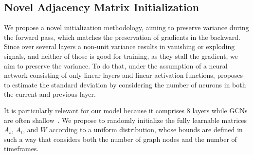 \documentclass[10pt,twocolumn,letterpaper]{article}
\begin{document}
\subsection{Novel Adjacency Matrix Initialization}\label{ssec:init}

We propose a novel initialization methodology, aiming to preserve variance during the forward pass, which matches the preservation of gradients in the backward.
Since over several layers a non-unit variance results in vanishing or exploding signals, and neither of those is good for training, as they stall the gradient, we aim to preserve the variance.
To do that, under the assumption of a neural network consisting of only linear layers and linear activation functions, \cite{glorot10} proposes to estimate the standard deviation by considering the number of neurons in both the current and previous layer.

It is particularly relevant for our model because it comprises 8 layers while GCNs are often shallow~\cite{kipf17}.
We propose to randomly initialize the fully learnable matrices $A_s$, $A_t$, and $W$ according to a uniform distribution, whose bounds are defined in such a way that considers both the number of graph nodes and the number of timeframes.
\end{document}
